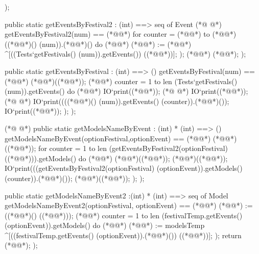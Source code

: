 \begin{vdmpp}[breaklines=true]
  );
 
 public static getEventsByFestival2 : (int) ==> seq of Event
(*@
\label{printEventsName:105}
@*)
  getEventsByFestival2(num) == (*@\vdmnotcovered{(}@*)
    for counter = (*@@*) to (*@@*) ((*@@*)() (num)).(*@@*)() do (*@\vdmnotcovered{(}@*)
    (*@@*) := (*@@*) ^[((Tests`getFestivals() (num)).getEvents()) ((*@@*))];
   );
   (*@@*) (*@@*);
  );
 
 public static getEventsByFestival : (int) ==> ()
  getEventsByFestival(num) == (*@\vdmnotcovered{(}@*)
      (*@@*)((*@@*));
    (*@@*) counter = 1 to len (Tests`getFestivals() (num)).getEvents() do (*@\vdmnotcovered{(}@*)
    IO`print((*@@*));
(*@
\label{getEventInf:117}
@*)
    IO`print((*@@*));
(*@
\label{getEventsByFestival:118}
@*)
    IO`print((((*@@*)() (num)).getEvents() (counter)).(*@@*)());
    IO`print((*@@*));
  );
  );
  

    
(*@
\label{getEventsByFestival2:125}
@*)
 public static getModelsNameByEvent : (int) * (int) ==> ()
  getModelsNameByEvent(optionFestival,optionEvent) == (*@\vdmnotcovered{(}@*)
      (*@@*)((*@@*));
    for counter = 1 to len (getEventsByFestival2(optionFestival) ((*@@*))).getModels() do (*@\vdmnotcovered{(}@*)
    (*@@*)((*@@*));
    (*@@*)((*@@*));
    IO`print(((getEventsByFestival2(optionFestival) (optionEvent)).getModels() (counter)).(*@@*)());
    (*@@*)((*@@*));
  );
  );
  
  public static getModelsNameByEvent2 :(int) * (int) ==> seq of Model
  getModelsNameByEvent2(optionFestival, optionEvent) == (*@\vdmnotcovered{(}@*)
  (*@@*) := ((*@@*)() ((*@@*)));
    (*@@*) counter = 1 to len (festivalTemp.getEvents() (optionEvent)).getModels() do (*@\vdmnotcovered{(}@*)
    (*@@*) := modelsTemp ^[((festivalTemp.getEvents() (optionEvent)).(*@@*)()) ((*@@*))];
   );
   return (*@@*);
  );
  

\end{vdmpp}
